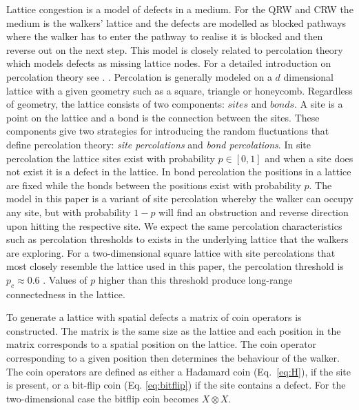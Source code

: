 \documentclass[aps,pra,twocolumn,amsmath,amssymb,nofootinbib,superscriptaddress]{revtex4}
\newcommand{\keith}[1]{{\color{cyan}{#1}}}
\begin{document}
Lattice congestion is a model of defects in a medium. For the QRW and CRW the medium is the walkers' lattice and the defects are modelled as blocked pathways where the walker has to enter the pathway to realise it is blocked and then reverse out on the next step. This model is closely related to percolation theory which models defects as missing lattice nodes. For a detailed introduction on percolation theory see \cite{bib:Shante1971, bib:blanc1986introduction}. \keith{L) Percolation theory has an associated scaling hypothesis that predicts critical values, such as percolation thresholds, depending on the dimension and geometry of the lattice}. Percolation is generally modeled on a $d$ dimensional lattice with a given geometry such as a square, triangle or honeycomb. Regardless of geometry, the lattice consists of two components: $\textit{sites}$ and $\textit{bonds}$. A site is a point on the lattice and a bond is the connection between the sites. These components give two strategies for introducing the random fluctuations that define percolation theory: \emph{site percolations} and \emph{bond percolations}. In site percolation the lattice sites exist with probability $p\in [0,1]$ and when a site does not exist it is a defect in the lattice. In bond percolation the positions in a lattice are fixed while the bonds between the positions exist with probability $p$. The model in this paper is a variant of site percolation whereby the walker can occupy any site, but with probability $1-p$ will find an obstruction and reverse direction upon hitting the respective site. We expect the same percolation characteristics such as percolation thresholds to exists in the underlying lattice that the walkers are exploring. For a two-dimensional square lattice with site percolations that most closely resemble the lattice used in this paper, the percolation threshold is $p_c\approx 0.6$ \cite{bib:PhysRevB.40.636}. Values of $p$ higher than this threshold produce long-range connectedness in the lattice. 

To generate a lattice with spatial defects a matrix of coin operators is constructed. The matrix is the same size as the lattice and each position in the matrix corresponds to a spatial position on the lattice. The coin operator corresponding to a given position then determines the behaviour of the walker. The coin operators are defined as either a Hadamard coin (Eq.~\ref{eq:H}), if the site is present, or a bit-flip coin (Eq. \ref{eq:bitflip}) if the site contains a defect. For the two-dimensional case the bitflip coin becomes $X\otimes X$.
\end{document}

